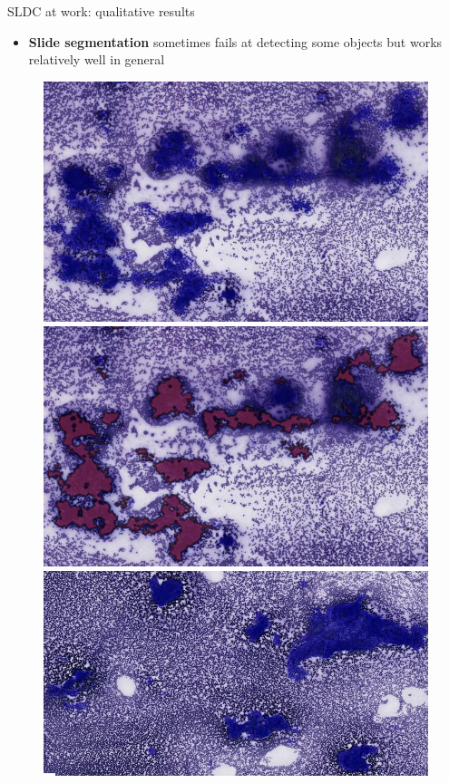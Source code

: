 \documentclass{beamer}
\begin{document}
\begin{frame}{SLDC at work: qualitative results}
	\begin{itemize}
		\item \textbf{Slide segmentation} sometimes fails at detecting some objects but works relatively well in general
	\end{itemize}
	
	\begin{figure}
		\includegraphics[scale=0.25]{images/success_pattern_1_nopat.png}
		\hspace{0.25cm}
		\includegraphics[scale=0.25]{images/success_pattern_1_pat.png} \\
		\vspace{0.1cm}
		\includegraphics[scale=0.25]{images/success_pattern_2_nopat.png}

\end{figure}
\end{frame}
\end{document}
